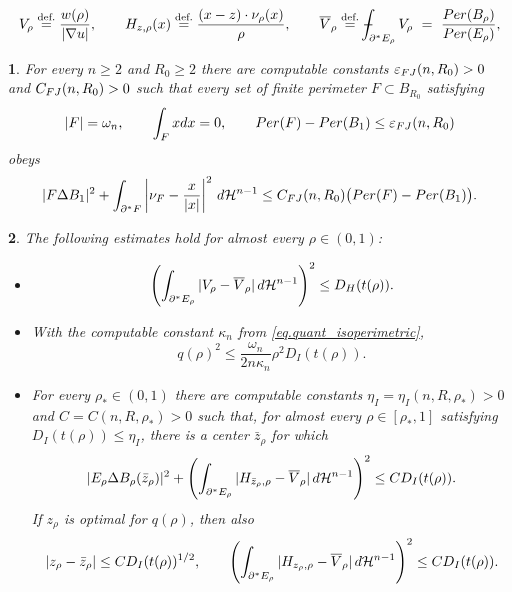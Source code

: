 \documentclass[10pt,a4paper]{amsart}
\newtheorem{proposition}{}
\newcommand\Per{\mathop{\rm Per}}
\def\XXint#1#2#3{{\setbox0=\hbox{$#1{#2#3}{\int}$}
  \vcenter{\hbox{$#2#3$}}\kern-.5\wd0}}
\def\Xint#1{\mathchoice{\XXint\displaystyle\textstyle{#1}}%
  {\XXint\textstyle\scriptstyle{#1}}%
  {\XXint\scriptstyle\scriptscriptstyle{#1}}%
  {\XXint\scriptscriptstyle\scriptscriptstyle{#1}}%
  \!\int}
\newcommand{\dHn}{\,\dd\mathcal{H}^{n-1}}
\def\dd{{\rm d}}
\newcommand{\eqdef}{\overset{\text{def.}}{=}}
\def\fint{\Xint-}
\begin{document}
\begin{equation}\label{eq.velocity_normals}
    V_\rho\eqdef\frac{w(\rho)}{|\nabla u|},\qquad
    H_{z,\rho}(x)\eqdef\frac{(x-z)\cdot\nu_\rho(x)}{\rho},\qquad
    \overline{V}_\rho\eqdef\fint_{\partial^*E_\rho}V_\rho\ =\ \frac{\Per(B_\rho)}{\Per(E_\rho)},
\end{equation}

 \begin{proposition}
 \label{prop.FJ-strong}
For every   $n\ge2$ and $R_0\ge2$ there are computable constants
$\varepsilon_{\rm FJ}(n,R_0)>0$ and $C_{\rm FJ}(n,R_0)>0$ such that every  set
of finite perimeter   $F\subset B_{R_0}$ satisfying
\[
 |F|=\omega_n,\qquad \int_Fx\dd x=0,
 \qquad \Per(F)-\Per(B_1)\le\varepsilon_{\rm FJ}(n,R_0)
\]
obeys
\begin{equation}\label{eq.FJ-exact}
 |F\Delta B_1|^2
 +\int_{\partial^*F}
 \left|\nu_F-\frac{x}{|x|}\right|^2\dHn
 \le C_{\rm FJ}(n,R_0)\bigl(\Per(F)-\Per(B_1)\bigr).
\end{equation}
\end{proposition}

\begin{proposition}\label{prop.estimates_q'_DH_DI}
The following estimates hold for almost every $\rho\in(0,1)$:
\begin{itemize}
\item[(1)]
  \[
     \left(\int_{\partial^*E_\rho}
    |V_\rho-\overline V_\rho|\dHn\right)^2
    \le D_H(t(\rho)).
 \]
 \item[(2)] With the computable constant $\kappa_n$ from
\eqref{eq.quant_isoperimetric},
\[
 q(\rho)^2
 \le\frac{\omega_n}{2n\kappa_n}\rho^2D_I(t(\rho)).
\]
\item[(3)] For every $\rho_*\in(0,1)$ there are computable constants
$\eta_I=\eta_I(n,R,\rho_*)>0$ and $C=C(n,R,\rho_*)>0$ such that, for almost
every $\rho\in[\rho_*,1]$ satisfying
$D_I(t(\rho))\le\eta_I$, there is a center $\bar z_\rho$ for which
\[
 |E_\rho\Delta B_\rho(\bar z_\rho)|^2
 +\left(\int_{\partial^*E_\rho}
 |H_{\bar z_\rho,\rho}-\overline V_\rho|\dHn\right)^2
 \le C D_I(t(\rho)).
\]
If  $z_\rho$ is optimal for $q(\rho)$, then also
\[
 |z_\rho-\bar z_\rho|\le C D_I(t(\rho))^{1/2},
 \qquad
 \left(\int_{\partial^*E_\rho}
 |H_{z_\rho,\rho}-\overline V_\rho|\dHn\right)^2
 \le C D_I(t(\rho)).
\]
 \end{itemize}
\end{proposition}
\end{document}
